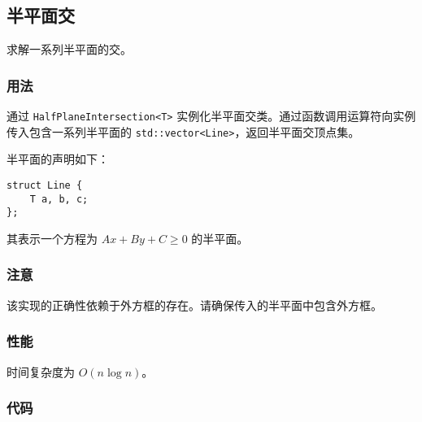 \subsection{半平面交}

求解一系列半平面的交。

\subsubsection{用法}

通过 \lstinline{HalfPlaneIntersection<T>} 实例化半平面交类。通过函数调用运算符向实例传入包含一系列半平面的 \lstinline{std::vector<Line>}，返回半平面交顶点集。

半平面的声明如下：

\begin{lstlisting}
struct Line {
    T a, b, c;
};
\end{lstlisting}

其表示一个方程为 $Ax + By + C \ge 0$ 的半平面。

\subsubsection{注意}

该实现的正确性依赖于外方框的存在。请确保传入的半平面中包含外方框。

\subsubsection{性能}

时间复杂度为 $O(n \log n)$。

\subsubsection{代码}


